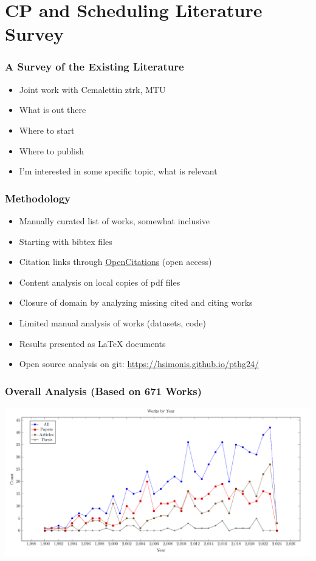\section{CP and Scheduling Literature Survey}

\begin{frame}
\frametitle{A Survey of the Existing Literature}
\begin{itemize}
\item Joint work with Cemalettin ztrk, MTU
\item What is out there
\item Where to start
\item Where to publish
\item I'm interested in some specific topic, what is relevant
\end{itemize}
\end{frame}

\begin{frame}
\frametitle{Methodology}
\begin{itemize}
\item Manually curated list of works, somewhat inclusive
\item Starting with bibtex files
\item Citation links through \href{https://opencitations.net/}{OpenCitations} (open access)
\item Content analysis on local copies of pdf files
\item Closure of domain by analyzing missing cited and citing works 
\item Limited manual analysis of works (datasets, code)
\item Results presented as LaTeX documents
\item Open source analysis on git: \url{https://hsimonis.github.io/pthg24/}
\end{itemize}
\end{frame}

\begin{frame}
\frametitle{Overall Analysis (Based on 671 Works)}
\includegraphics[width=\textwidth]{survey/worksbyyear}
\end{frame}

